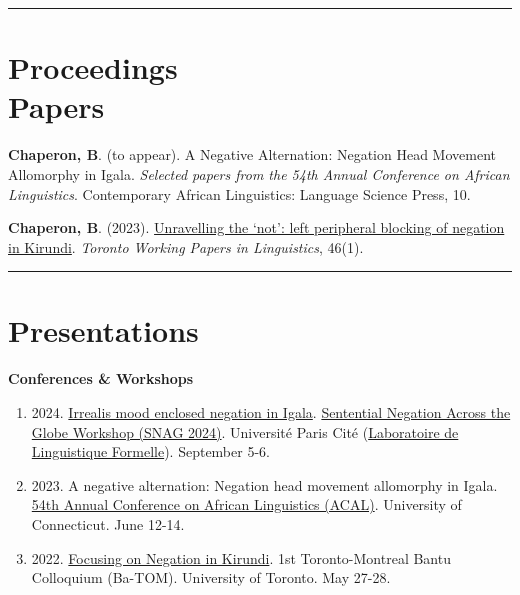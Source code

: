 \documentclass[margin,line]{resume}
\begin{document}
\begin{resume}
	\vspace{-0.7em}\rule{\textwidth}{0.4pt}


	\section{\mysidestyle Proceedings\\Papers}

	 {\textbf{Chaperon, B}. (to appear). A Negative Alternation: Negation Head Movement Allomorphy in Igala. \textit{Selected papers from the 54th Annual Conference on African Linguistics}. Contemporary African Linguistics: Language Science Press, 10.}

	 {\textbf{Chaperon, B}. (2023). \href{https://twpl.library.utoronto.ca/index.php/twpl/article/view/39257}{Unravelling the `not': left peripheral blocking of negation in Kirundi}. \textit{Toronto Working Papers in Linguistics}, 46(1).}%

	\vspace{-0.9em}\rule{\textwidth}{0.4pt}

	\newpage


	\section{\mysidestyle Presentations}

	\textbf{Conferences \& Workshops}
	\begin{enumerate}[-, leftmargin=1em, topsep=4pt]
		
		\item[] {2024. \href{https://parissnag.com/conf/program/chaperon}{Irrealis mood enclosed negation in Igala}. \href{https://parissnag.com/conf}{Sentential Negation Across the Globe Workshop (SNAG 2024)}. Université Paris Cité (\href{http://www.llf.cnrs.fr/en}{Laboratoire de Linguistique Formelle}). September 5-6.}
		
		\item[] {2023. A negative alternation: Negation head movement allomorphy in Igala. \href{https://uconnuecs.cventevents.com/event/aef2d257-6a6a-41b5-b83d-2c6efc60aac5/summary}{54th Annual Conference on African Linguistics (ACAL)}. University of Connecticut. June 12-14.}
		
		\item[] {2022. \href{https://mcling.blogs.mcgill.ca/2022/05/24/mcgill-at-ba-tom-1/}{Focusing on Negation in Kirundi}. 1st Toronto-Montreal Bantu Colloquium (Ba-TOM). University of Toronto. May 27-28.}
	\end{enumerate}
	

\end{resume}
\end{document}
